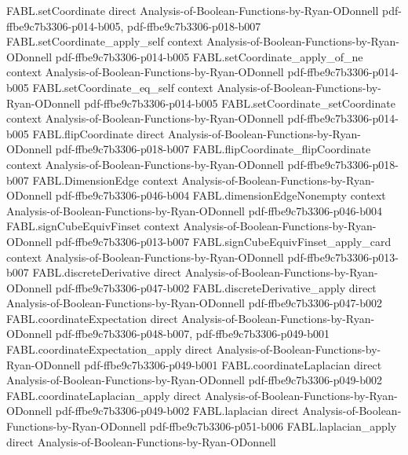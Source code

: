 \begin{theorem}
\proofstep
  {FABL.setCoordinate}
  {direct}
  {Analysis-of-Boolean-Functions-by-Ryan-ODonnell}
  {pdf-ffbe9c7b3306-p014-b005,
    pdf-ffbe9c7b3306-p018-b007}
\proofstep
  {FABL.setCoordinate_apply_self}
  {context}
  {Analysis-of-Boolean-Functions-by-Ryan-ODonnell}
  {pdf-ffbe9c7b3306-p014-b005}
\proofstep
  {FABL.setCoordinate_apply_of_ne}
  {context}
  {Analysis-of-Boolean-Functions-by-Ryan-ODonnell}
  {pdf-ffbe9c7b3306-p014-b005}
\proofstep
  {FABL.setCoordinate_eq_self}
  {context}
  {Analysis-of-Boolean-Functions-by-Ryan-ODonnell}
  {pdf-ffbe9c7b3306-p014-b005}
\proofstep
  {FABL.setCoordinate_setCoordinate}
  {context}
  {Analysis-of-Boolean-Functions-by-Ryan-ODonnell}
  {pdf-ffbe9c7b3306-p014-b005}
\proofstep
  {FABL.flipCoordinate}
  {direct}
  {Analysis-of-Boolean-Functions-by-Ryan-ODonnell}
  {pdf-ffbe9c7b3306-p018-b007}
\proofstep
  {FABL.flipCoordinate_flipCoordinate}
  {context}
  {Analysis-of-Boolean-Functions-by-Ryan-ODonnell}
  {pdf-ffbe9c7b3306-p018-b007}
\proofstep
  {FABL.DimensionEdge}
  {context}
  {Analysis-of-Boolean-Functions-by-Ryan-ODonnell}
  {pdf-ffbe9c7b3306-p046-b004}
\proofstep
  {FABL.dimensionEdgeNonempty}
  {context}
  {Analysis-of-Boolean-Functions-by-Ryan-ODonnell}
  {pdf-ffbe9c7b3306-p046-b004}
\proofstep
  {FABL.signCubeEquivFinset}
  {context}
  {Analysis-of-Boolean-Functions-by-Ryan-ODonnell}
  {pdf-ffbe9c7b3306-p013-b007}
\proofstep
  {FABL.signCubeEquivFinset_apply_card}
  {context}
  {Analysis-of-Boolean-Functions-by-Ryan-ODonnell}
  {pdf-ffbe9c7b3306-p013-b007}
\proofstep
  {FABL.discreteDerivative}
  {direct}
  {Analysis-of-Boolean-Functions-by-Ryan-ODonnell}
  {pdf-ffbe9c7b3306-p047-b002}
\proofstep
  {FABL.discreteDerivative_apply}
  {direct}
  {Analysis-of-Boolean-Functions-by-Ryan-ODonnell}
  {pdf-ffbe9c7b3306-p047-b002}
\proofstep
  {FABL.coordinateExpectation}
  {direct}
  {Analysis-of-Boolean-Functions-by-Ryan-ODonnell}
  {pdf-ffbe9c7b3306-p048-b007,
    pdf-ffbe9c7b3306-p049-b001}
\proofstep
  {FABL.coordinateExpectation_apply}
  {direct}
  {Analysis-of-Boolean-Functions-by-Ryan-ODonnell}
  {pdf-ffbe9c7b3306-p049-b001}
\proofstep
  {FABL.coordinateLaplacian}
  {direct}
  {Analysis-of-Boolean-Functions-by-Ryan-ODonnell}
  {pdf-ffbe9c7b3306-p049-b002}
\proofstep
  {FABL.coordinateLaplacian_apply}
  {direct}
  {Analysis-of-Boolean-Functions-by-Ryan-ODonnell}
  {pdf-ffbe9c7b3306-p049-b002}
\proofstep
  {FABL.laplacian}
  {direct}
  {Analysis-of-Boolean-Functions-by-Ryan-ODonnell}
  {pdf-ffbe9c7b3306-p051-b006}
\proofstep
  {FABL.laplacian_apply}
  {direct}
  {Analysis-of-Boolean-Functions-by-Ryan-ODonnell}

\end{theorem}
